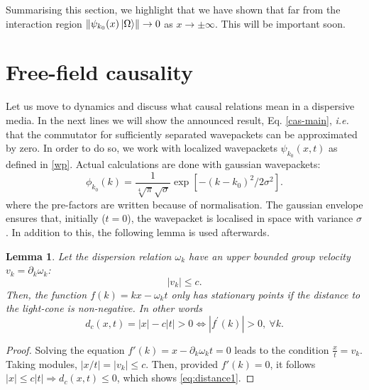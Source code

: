 \documentclass[notitlepage, prx, preprint, amsmath,superscriptaddress,amssymb]{revtex4-1}
\newtheorem{lemma}{Lemma}[section]
\begin{document}
Summarising this section, we highlight that we have shown that far from the interaction region $\Vert{\psi_{k_0}(x)\ket{\Omega}}\Vert \to0$ as $x\to\pm\infty$.  This will be important soon.





\section{Free-field causality}

Let us move to dynamics and discuss what causal relations mean in a dispersive media.   In the next lines we will show the announced result, Eq. \eqref{cas-main}, \emph{i.e.} that  the commutator   for sufficiently separated wavepackets can be approximated by zero.    
In order to do so, we  work with localized wavepackets $\psi_{k_0}(x,t)$ as defined in \eqref{wp}.  Actual calculations are done with gaussian wavepackets:
\begin{equation}
\phi_{k_0}(k) = \frac{1}{\sqrt[4]{\pi}\sqrt{\sigma}}
\exp\left[-(k-k_0)^2/2\sigma^2\right].
\label{eq:gaussian}
\end{equation}
where the pre-factors are written because of normalisation.   The gaussian envelope ensures that, initially ($t=0$), the wavepacket is localised in space with variance $\sigma$.   
In addition to this, the following lemma is used afterwards.

\begin{lemma}
\label{lemma:cones}
Let the dispersion relation $\omega_k$ have an upper bounded group velocity $v_k=\partial_k \omega_k$:
\begin{equation}
\vert  v_k \vert \leq c.
\end{equation}
Then, the function $f(k) = k x - \omega_k t$ only has stationary points if the distance to the light-cone is non-negative. In other words
\begin{equation}
d_c(x,t) =  | x | - c | t |  > 0 \Leftrightarrow | f^\prime (k) | > 0,\: \forall k.\label{eq:distance1}
\end{equation}
\end{lemma}

\begin{proof}
Solving the equation $f'(k)=x - \partial_k \omega_k t = 0$ leads to the condition $\frac{x}{t} = v_k$.  Taking modules,  $|x/t|=|v_k|\leq c$. Then, provided $f'(k)=0$, it follows $|x|\leq c|t|\Rightarrow d_c(x,t)\leq 0$, which shows \eqref{eq:distance1}.
\end{proof}
\end{document}
